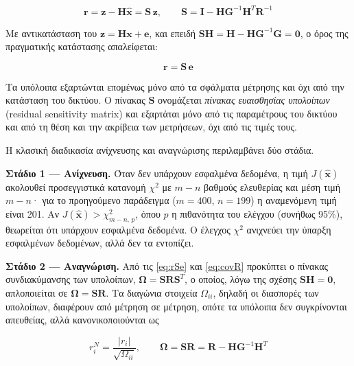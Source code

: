 \begin{equation}
\mathbf{r} = \mathbf{z} - \mathbf{H}\hat{\mathbf{x}} = \mathbf{S}\,\mathbf{z}, \qquad
\mathbf{S} = \mathbf{I} - \mathbf{H}\mathbf{G}^{-1}\mathbf{H}^{T}\mathbf{R}^{-1}
\label{eq:resS}
\end{equation}

Με αντικατάσταση του $\mathbf{z} = \mathbf{H}\mathbf{x} + \mathbf{e}$, και επειδή
$\mathbf{S}\mathbf{H} = \mathbf{H} - \mathbf{H}\mathbf{G}^{-1}\mathbf{G} = \mathbf{0}$, ο όρος
της πραγματικής κατάστασης απαλείφεται:

\begin{equation}
\mathbf{r} = \mathbf{S}\,\mathbf{e}
\label{eq:rSe}
\end{equation}

Τα υπόλοιπα εξαρτώνται επομένως μόνο από τα σφάλματα μέτρησης και όχι από την κατάσταση του
δικτύου. Ο πίνακας $\mathbf{S}$ ονομάζεται \emph{πίνακας ευαισθησίας υπολοίπων} (residual
sensitivity matrix) και εξαρτάται μόνο από τις παραμέτρους του δικτύου και από τη θέση και την
ακρίβεια των μετρήσεων, όχι από τις τιμές τους.

Η κλασική διαδικασία ανίχνευσης και αναγνώρισης περιλαμβάνει δύο στάδια.

\textbf{Στάδιο 1 --- Ανίχνευση.} Όταν δεν υπάρχουν εσφαλμένα δεδομένα, η τιμή
$J(\hat{\mathbf{x}})$ ακολουθεί προσεγγιστικά κατανομή $\chi^2$ με $m-n$ βαθμούς ελευθερίας
και μέση τιμή $m-n$· για το προηγούμενο παράδειγμα ($m = 400$, $n = 199$) η αναμενόμενη τιμή
είναι 201. Αν $J(\hat{\mathbf{x}}) > \chi^2_{m-n,\,p}$, όπου $p$ η πιθανότητα του ελέγχου
(συνήθως 95\%), θεωρείται ότι υπάρχουν εσφαλμένα δεδομένα. Ο έλεγχος $\chi^2$ ανιχνεύει την
ύπαρξη εσφαλμένων δεδομένων, αλλά δεν τα εντοπίζει.

\textbf{Στάδιο 2 --- Αναγνώριση.} Από τις \eqref{eq:rSe} και \eqref{eq:covR} προκύπτει ο
πίνακας συνδιακύμανσης των υπολοίπων, $\boldsymbol{\Omega} = \mathbf{S}\mathbf{R}\mathbf{S}^{T}$,
ο οποίος, λόγω της σχέσης $\mathbf{S}\mathbf{H} = \mathbf{0}$, απλοποιείται σε
$\boldsymbol{\Omega} = \mathbf{S}\mathbf{R}$. Τα διαγώνια στοιχεία $\Omega_{ii}$, δηλαδή οι διασπορές των υπολοίπων, διαφέρουν από μέτρηση
σε μέτρηση, οπότε τα υπόλοιπα δεν συγκρίνονται απευθείας, αλλά κανονικοποιούνται ως

\begin{equation}
r_i^{N} = \frac{|r_i|}{\sqrt{\Omega_{ii}}}, \qquad
\boldsymbol{\Omega} = \mathbf{S}\mathbf{R} = \mathbf{R} - \mathbf{H}\mathbf{G}^{-1}\mathbf{H}^{T}
\label{eq:normres}
\end{equation}

